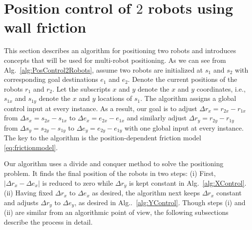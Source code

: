 \section{Position control of $2$ robots using wall friction}\label{sec:PostionControl2Robots}
This section describes an algorithm for positioning two robots and introduces concepts that will be used for multi-robot positioning.
As we can see from Alg.~\ref{alg:PosControl2Robots}, assume two robots are initialized at $s_1$ and $s_2$ with corresponding goal destinations $e_1$ and $e_2$. 
Denote the current positions of the robots  $r_1$ and $r_2$. 
Let the subscripts $x$ and $y$ denote the $x$ and $y$ coordinates, i.e., $s_{1x}$ and $s_{1y}$ denote the $x$ and $y$ locations of $s_1$. 
The algorithm assigns a global control input at every instance.
 As a result, our goal is to adjust 
 $\Delta r_x = r_{2x}-r_{1x}$ from $\Delta s_x = s_{2x}-s_{1x}$ to $\Delta e_x = e_{2x}-e_{1x}$ and similarly adjust 
 $\Delta r_y = r_{2y}-r_{1y}$ from $\Delta s_y = s_{2y}-s_{1y}$ to $\Delta e_y = e_{2y}-e_{1y}$ with one global input at every instance. 
 The key to the algorithm is the position-dependent friction model \eqref{eq:frictionmodel}.

Our algorithm uses a divide and conquer method to solve the positioning problem. 
It finds the final position of the robots in two steps: (i) First, $|\Delta r_x - \Delta e_x |$ is reduced to zero while  $\Delta r_y$ is kept constant in Alg.~\ref{alg:XControl}. 
(ii) Having fixed $\Delta r_x$ to $\Delta e_x$ as desired, the  algorithm next keeps $\Delta r_x$ constant and adjusts $\Delta r_y$ to $\Delta e_y$, as desired in Alg..~\ref{alg:YControl}. 
Though steps (i) and (ii) are similar from an algorithmic point of view, the following subsections describe the process in detail. 

